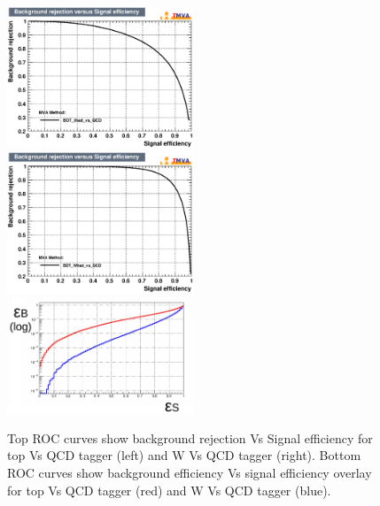 \documentclass{cernrep}
\begin{document}
\begin{figure}[!htb]\centering
\includegraphics[width=0.495\textwidth]{Fig/TMVA/thad_vs_QCD/rejBvsS.eps}
\includegraphics[width=0.495\textwidth]{Fig/TMVA/Whad_vs_QCD/rejBvsS.eps}
\includegraphics[width=0.495\textwidth]{Fig/TMVA/effQCD_vs_effWhadBlue_thadRed_log.png}
\caption{Top ROC curves show background rejection Vs Signal efficiency for top Vs QCD tagger (left) and W Vs QCD tagger (right). Bottom ROC curves show background efficiency Vs signal efficiency overlay for top Vs QCD tagger (red) and W Vs QCD tagger (blue).}
\label{fig:TMVA_ROC}
\end{figure}
\end{document}
